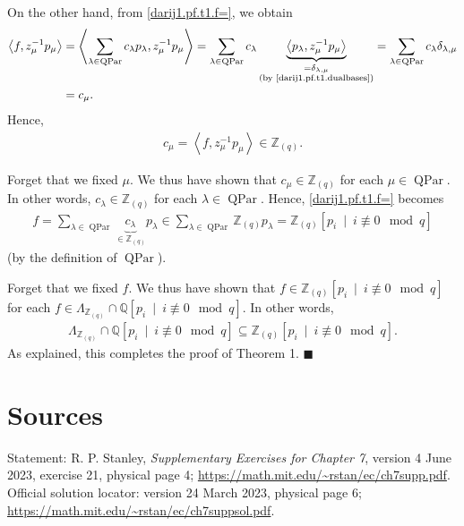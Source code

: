 \documentclass[10pt,a4paper]{article}
\begin{document}
On the other hand, from \eqref{darij1.pf.t1.f=}, we obtain
\begin{align*}
\left\langle f,z_{\mu}^{-1}p_{\mu}\right\rangle  & =\left\langle \sum
_{\lambda\in\operatorname{QPar}}c_{\lambda}p_{\lambda},z_{\mu}^{-1}p_{\mu
}\right\rangle =\sum_{\lambda\in\operatorname{QPar}}c_{\lambda}
\underbrace{\left\langle p_{\lambda},z_{\mu}^{-1}p_{\mu}\right\rangle
}_{\substack{=\delta_{\lambda,\mu}\\\text{(by \eqref{darij1.pf.t1.dualbases})}
}}=\sum_{\lambda\in\operatorname{QPar}}c_{\lambda}\delta_{\lambda,\mu}\\
& =c_{\mu}.
\end{align*}
Hence,
\begin{align*}
c_{\mu}=\left\langle f,z_{\mu}^{-1}p_{\mu}\right\rangle \in\mathbb{Z}_{\left(
q\right)  }.
\end{align*}




Forget that we fixed $\mu$. We thus have shown that $c_{\mu}\in\mathbb{Z}
_{\left(  q\right)  }$ for each $\mu\in\operatorname{QPar}$. In other words,
$c_{\lambda}\in\mathbb{Z}_{\left(  q\right)  }$ for each $\lambda
\in\operatorname{QPar}$. Hence, \eqref{darij1.pf.t1.f=} becomes
\begin{align*}
f=\sum_{\lambda\in\operatorname{QPar}}\underbrace{c_{\lambda}}_{\in
\mathbb{Z}_{\left(  q\right)  }}p_{\lambda}\in\sum_{\lambda\in
\operatorname{QPar}}\mathbb{Z}_{\left(  q\right)  }p_{\lambda}=\mathbb{Z}
_{\left(  q\right)  }\left[  p_{i}\ \mid\ i\not \equiv 0\mod 
q\right]
\end{align*}
(by the definition of $\operatorname{QPar}$).




Forget that we fixed $f$. We thus have shown that $f\in\mathbb{Z}_{\left(
q\right)  }\left[  p_{i}\ \mid\ i\not \equiv 0\mod q\right]  $
for each $f\in\Lambda_{\mathbb{Z}_{\left(  q\right)  }}\cap\mathbb{Q}\left[
p_{i}\ \mid\ i\not \equiv 0\mod q\right]  $. In other words,
\begin{align*}
\Lambda_{\mathbb{Z}_{\left(  q\right)  }}\cap\mathbb{Q}\left[  p_{i}
\ \mid\ i\not \equiv 0\mod q\right]  \subseteq \mathbb{Z}_{\left(  q\right)  }\left[ p_{i}\ \mid\ i\not \equiv 0\mod q\right] .
\end{align*}
As explained, this completes the proof of Theorem 1. $\blacksquare$



\section*{Sources}
Statement: R. P. Stanley, \emph{Supplementary Exercises for Chapter 7},
version 4 June 2023, exercise 21, physical page 4;
\url{https://math.mit.edu/~rstan/ec/ch7supp.pdf}.
Official solution locator: version 24 March 2023, physical page 6;
\url{https://math.mit.edu/~rstan/ec/ch7suppsol.pdf}.
\end{document}
